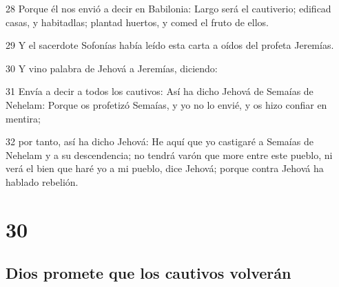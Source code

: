 \par 28 Porque él nos envió a decir en Babilonia: Largo será el cautiverio; edificad casas, y habitadlas; plantad huertos, y comed el fruto de ellos.
\par 29 Y el sacerdote Sofonías había leído esta carta a oídos del profeta Jeremías.
\par 30 Y vino palabra de Jehová a Jeremías, diciendo:
\par 31 Envía a decir a todos los cautivos: Así ha dicho Jehová de Semaías de Nehelam: Porque os profetizó Semaías, y yo no lo envié, y os hizo confiar en mentira;
\par 32 por tanto, así ha dicho Jehová: He aquí que yo castigaré a Semaías de Nehelam y a su descendencia; no tendrá varón que more entre este pueblo, ni verá el bien que haré yo a mi pueblo, dice Jehová; porque contra Jehová ha hablado rebelión.

\chapter{30}

\section*{Dios promete que los cautivos volverán}


